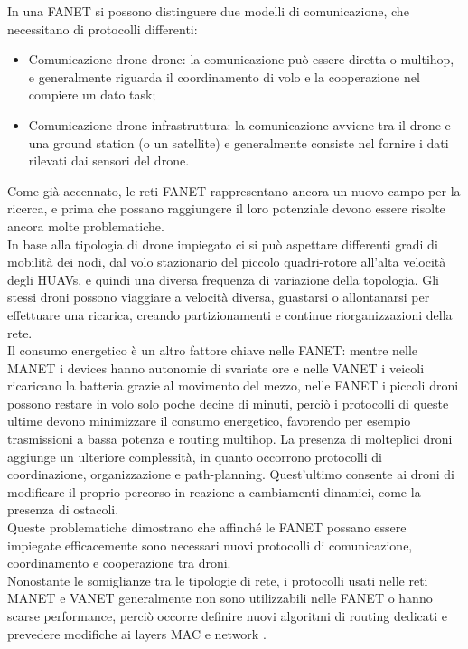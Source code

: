 In una FANET si possono distinguere due modelli di comunicazione, che necessitano di protocolli differenti:
\begin{itemize}
	\item Comunicazione drone-drone: la comunicazione può essere diretta o multihop, e generalmente riguarda il coordinamento di volo e la cooperazione nel compiere un dato task;
	\item Comunicazione drone-infrastruttura: la comunicazione avviene tra il drone e una ground station (o un satellite) e generalmente consiste nel fornire i dati rilevati dai sensori del drone.
\end{itemize}

Come già accennato, le reti FANET rappresentano ancora un nuovo campo per la ricerca, e prima che possano raggiungere il loro potenziale devono essere risolte ancora molte problematiche. \\
In base alla tipologia di drone impiegato ci si può aspettare differenti gradi di mobilità dei nodi, dal volo stazionario del piccolo quadri-rotore all'alta velocità degli HUAVs, e quindi una diversa frequenza di variazione della topologia. 
Gli stessi droni possono viaggiare a velocità diversa, guastarsi o allontanarsi per effettuare una ricarica, creando partizionamenti e continue riorganizzazioni della rete. \\
Il consumo energetico è un altro fattore chiave nelle FANET: mentre nelle MANET i devices hanno  autonomie di svariate ore e nelle VANET i veicoli ricaricano la batteria grazie al movimento del mezzo, nelle FANET i piccoli droni possono restare in volo solo poche decine di minuti, perciò i protocolli di queste ultime devono minimizzare il consumo energetico, favorendo per esempio trasmissioni a bassa potenza e routing multihop. 
La presenza di molteplici droni aggiunge un ulteriore complessità, in quanto occorrono protocolli di coordinazione, organizzazione e path-planning.
Quest'ultimo consente ai droni di modificare il proprio percorso in reazione a cambiamenti dinamici, come la presenza di ostacoli. \\
Queste problematiche dimostrano che affinché le FANET possano essere impiegate efficacemente sono necessari nuovi  protocolli di comunicazione, coordinamento e cooperazione tra droni. \\
Nonostante le somiglianze tra le tipologie di rete, i protocolli usati nelle reti MANET e VANET generalmente non sono utilizzabili nelle FANET o hanno scarse performance, perciò occorre definire nuovi algoritmi di routing dedicati e prevedere modifiche ai layers MAC e network \cite{7317490}.

